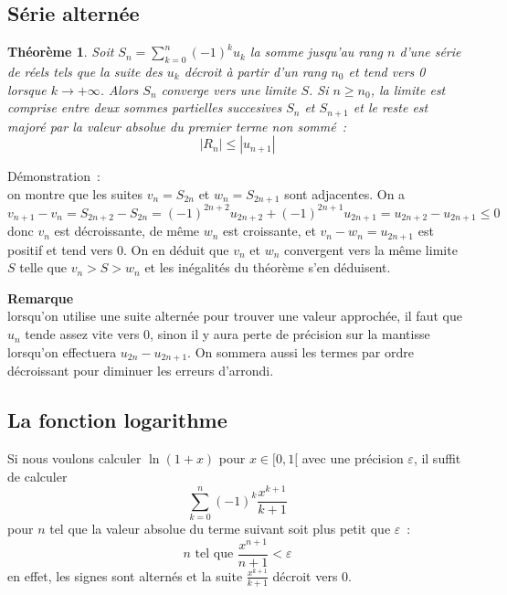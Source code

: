 \documentclass[a4paper,11pt]{article}
\newtheorem{thm}{Théorème}
\begin{document}
\subsection{Série alternée}
\begin{thm}
Soit $S_n= \sum_{k=0}^n (-1)^k u_k$ la somme jusqu'au rang $n$ d'une
s\'erie de r\'eels tels que la suite des $u_k$ d\'ecroit \`a partir
d'un rang $n_0$ et tend vers 0
lorsque $k\rightarrow +\infty$. Alors $S_n$ converge vers une limite
$S$. Si $n\geq n_0$, la limite est comprise entre deux sommes
partielles succesives $S_n$ et $S_{n+1}$ et le reste est major\'e par
la valeur absolue du premier terme non somm\'e~:
\[ |R_n| \leq |u_{n+1}|\]
\end{thm}
D\'emonstration~:\\
on montre que les suites $v_n=S_{2n}$ et $w_n=S_{2n+1}$ sont
adjacentes. On a 
\[ v_{n+1}-v_n= S_{2n+2}-S_{2n}= (-1)^{2n+2} u_{2n+2} + (-1)^{2n+1}
u_{2n+1} = u_{2n+2}-u_{2n+1} \leq 0\]
donc $v_n$ est d\'ecroissante, de m\^eme $w_n$ est croissante,
et $v_n-w_n=u_{2n+1}$ est positif et tend vers 0. On en d\'eduit que
$v_n$ et $w_n$ convergent vers la m\^eme limite $S$ telle que
$v_n>S>w_n$ et les in\'egalit\'es du th\'eor\`eme s'en d\'eduisent.

{\bf Remarque}\\
lorsqu'on utilise une suite altern\'ee pour
trouver une valeur approch\'ee, il faut que $u_n$ tende assez
vite vers 0, sinon il y aura perte de pr\'ecision sur la mantisse
lorsqu'on effectuera $u_{2n}-u_{2n+1}$. On sommera aussi les termes
par ordre d\'ecroissant pour diminuer les erreurs d'arrondi.

\subsection{La fonction logarithme}
Si nous voulons calculer $\ln(1+x)$ pour $x \in [0,1[$ avec une
pr\'ecision $\varepsilon$, il suffit de calculer
\[ \sum_{k=0}^n (-1)^k \frac{x^{k+1}}{k+1}\]
pour $n$ tel que la valeur absolue du terme suivant soit plus petit 
que $\varepsilon$~:
\[ n \mbox{ tel que } \frac{x^{n+1}}{n+1} < \varepsilon \]
en effet, les signes sont altern\'es et la suite $\frac{x^{k+1}}{k+1}$
d\'ecroit vers 0.
\end{document}
